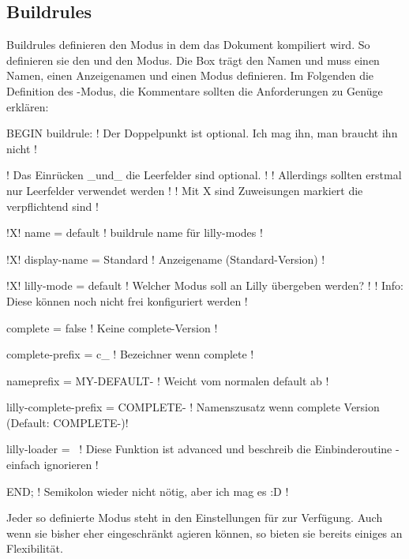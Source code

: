 \subsection{Buildrules}
Buildrules definieren den Modus in dem das Dokument kompiliert wird. So definieren sie den  und den  Modus. Die Box trägt den Namen  und muss einen Namen, einen Anzeigenamen und einen Modus definieren. Im Folgenden die Definition des -Modus, die Kommentare sollten die Anforderungen zu Genüge erklären:
{%
\begin{plaingepard}
BEGIN buildrule: ! Der Doppelpunkt ist optional. Ich mag ihn, man braucht ihn nicht !

    ! Das Einrücken _und_ die Leerfelder sind optional. !
    ! Allerdings sollten erstmal nur Leerfelder verwendet werden !
    ! Mit X sind Zuweisungen markiert die verpflichtend sind !

!X!  name                   = default     ! buildrule name für lilly-modes !

!X!  display-name           = Standard    ! Anzeigename (Standard-Version) !

!X!  lilly-mode             = default     ! Welcher Modus soll an Lilly übergeben werden? !
                                          ! Info: Diese können noch nicht frei konfiguriert werden !

     complete               = false       ! Keine complete-Version !

     complete-prefix        = c_          ! Bezeichner wenn complete !

     nameprefix             = MY-DEFAULT- ! Weicht vom normalen default ab !

     lilly-complete-prefix  = COMPLETE-   ! Namenszusatz wenn complete Version (Default: COMPLETE-)!

     lilly-loader           = \
                    ! Diese Funktion ist advanced und beschreib die Einbinderoutine - einfach
                      ignorieren !

END; ! Semikolon wieder nicht nötig, aber ich mag es :D !
\end{plaingepard}
}
Jeder so definierte Modus steht in den Einstellungen für  zur Verfügung. Auch wenn sie bisher eher eingeschränkt agieren können, so bieten sie bereits einiges an Flexibilität.

